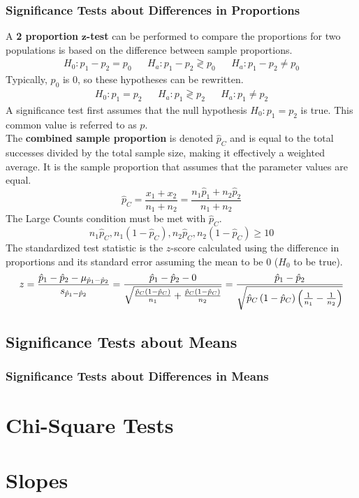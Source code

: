 \documentclass[../AP_Statistics.tex]{subfiles}
\begin{document}
			\subsection*{Significance Tests about Differences in Proportions}
				A \textbf{2 proportion} $\pmb{z}$\textbf{-test} can be performed to compare the proportions for two populations is based on the difference between sample proportions.
				\begin{align*}
					H_0:p_1 - p_2 = p_0 && H_a: p_1 - p_2 \gtrless p_0 && H_a:p_1 - p_2 \ne p_0
				\end{align*}
				Typically, $p_0$ is 0, so these hypotheses can be rewritten.
				\begin{align*}
					H_0:p_1 = p_2 && H_a:p_1 \gtrless p_2 && H_a:p_1 \ne p_2
				\end{align*}
				A significance test first assumes that the null hypothesis $H_0:p_1 = p_2$ is true. This common value is referred to as $p$. \\
				The \textbf{combined sample proportion} is denoted $\hat{p}_C$ and is equal to the total successes divided by the total sample size, making it effectively a weighted average. It is the sample proportion that assumes that the parameter values are equal.
				\[\hat{p}_C = \frac{x_1 + x_2}{n_1 + n_2} = \frac{n_1\hat{p}_1 + n_2\hat{p}_2}{n_1 + n_2}\]
				The Large Counts condition must be met with $\hat{p}_C$.
				\[n_1\hat{p}_C, n_1(1 - \hat{p}_C), n_2\hat{p}_C, n_2(1 - \hat{p}_C) \ge 10\]
				The standardized test statistic is the $z$-score calculated using the difference in proportions and its standard error assuming the mean to be 0 ($H_0$ to be true).
				\[z = \frac{\hat{p}_1 - \hat{p}_2 - \mu_{\hat{p}_1 - \hat{p}_2}}{s_{\hat{p}_1 - \hat{p}_2}} = \frac{\hat{p}_1 - \hat{p}_2 - 0}{\sqrt{\frac{\hat{p}_C\left(1 - \hat{p}_C\right)}{n_1} + \frac{\hat{p}_C\left(1 - \hat{p}_C\right)}{n_2}}} = \frac{\hat{p}_1 - \hat{p}_2}{\sqrt{\hat{p}_C\left(1 - \hat{p}_C\right)\left(\frac{1}{n_1} - \frac{1}{n_2}\right)}}\]
		\section{Significance Tests about Means}
			\subsection*{Significance Tests about Differences in Means}
	\chapter{Chi-Square Tests}
	\chapter{Slopes}
\end{document}
